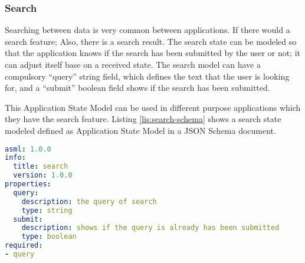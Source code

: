 \subsubsection{Search}
Searching between data is very common between applications. If there would a search feature; Also, there is a search result. The search state can be modeled so that the application knows if the search has been submitted by the user or not; it can adjust itself base on a received state. The search model can have a compulsory “query” string field, which defines the text that the user is looking for, and a “submit” boolean field shows if the search has been submitted.

This Application State Model can be used in different purpose applications which they have the search feature. Listing \ref{lis:search-schema} shows a search state modeled defined as Application State Model in a JSON Schema document.

\lstset{
  label=lis:search-schema, caption=Search example Application State Model as JSON Schema in YAML.
}
\begin{lstlisting}[language=yaml]
asml: 1.0.0
info:
  title: search
  version: 1.0.0
properties:
  query:
    description: the query of search
    type: string
  submit:
    description: shows if the query is already has been submitted
    type: boolean
required:
- query
\end{lstlisting}
